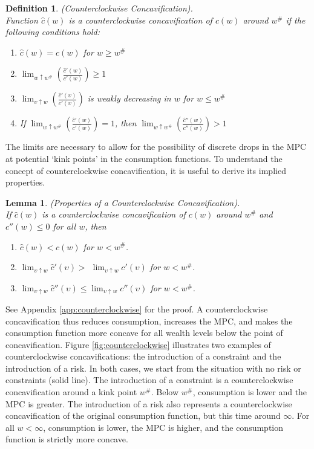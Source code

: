 \documentclass[titlepage]{\econtex}
\providecommand{\wAlt}{\omega}
\newtheorem{defn}{Definition}
\newtheorem{lemma}{Lemma}
\begin{document}
\begin{defn}\label{defn:cconcavification}(Counterclockwise Concavification). \\
	Function $\hat{c}(w)$ is a counterclockwise concavification of $c(w)$ around $w^{\#}$ if the following conditions hold:
	\begin{enumerate}
		\item $\hat{c}(w) = c(w)$ for $w \geq w^{\#}$
		\item $\lim_{w \uparrow w^{\#}} \left(\frac{\hat{c}'(w)}{c'(w)}\right)  \geq 1$
		\item $\lim_{\upsilon \uparrow w} \left(\frac{\hat{c}'(\upsilon)}{c'(\upsilon)}\right)$ is weakly decreasing in $w$ for $w \leq w^{\#}$
		\item If $\lim_{w \uparrow w^{\#}} \left(\frac{\hat{c}'(w)}{c'(w)}\right)  = 1$, then $\lim_{w \uparrow w^{\#}} \left(\frac{\hat{c}''(w)}{c''(w)}\right) > 1$
	\end{enumerate}
\end{defn}
The limits are necessary to allow for the possibility of discrete drops in the MPC at potential `kink points' in the consumption functions. To understand the concept of counterclockwise concavification, it is useful to derive its implied properties.




\begin{lemma}\label{lem:counterclockwise}(Properties of a Counterclockwise Concavification). \\
	If $\hat{c}(w)$ is a counterclockwise concavification of $c(w)$ around $w^{\#}$ and $c''(w) \leq 0$ for all $w$, then
	\begin{enumerate}
		\item $\hat{c}(w) < c(w)$ for  $w < w^{\#}$.
		\item $\lim_{\upsilon \uparrow w} \hat{c}'(\upsilon) >$ $\lim_{\upsilon \uparrow w} c'(\upsilon)$ for $w < w^{\#}$.
		\item $\lim_{\upsilon \uparrow w} \hat{c}''(\upsilon) \leq \lim_{\upsilon \uparrow w} c''(\upsilon)$ for $w < w^{\#}$.
	\end{enumerate}
\end{lemma}
See Appendix \ref{app:counterclockwise} for the proof. A counterclockwise concavification thus reduces consumption, increases the MPC, and makes the consumption function more concave for all wealth levels below the point of concavification. Figure \ref{fig:counterclockwise} illustrates two examples of counterclockwise concavifications: the introduction of a constraint and the introduction of a risk. In both cases, we start from the situation with no risk or constraints (solid line). The introduction of a constraint is a counterclockwise concavification around a kink point $w^{\#}$. Below $w^{\#}$, consumption is lower and the MPC is greater. The introduction of a risk also represents a counterclockwise concavification of the original consumption function, but this time around $\infty$. For all $w < \infty$, consumption is lower, the MPC is higher, and the consumption function is strictly more concave.
\end{document}
